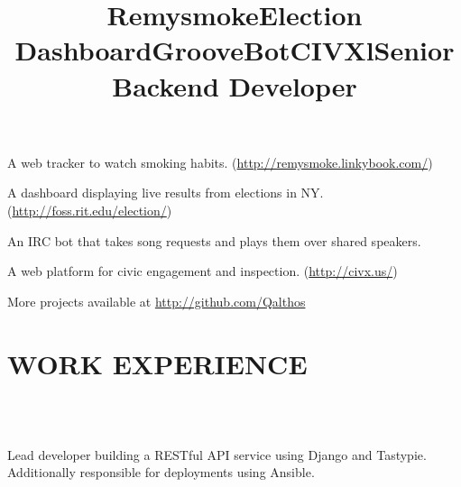 \documentclass[line]{res}
\begin{document}
\begin{resume}
    \title{Remysmoke}
    \begin{position}
        A web tracker to watch smoking habits.
        (\url{http://remysmoke.linkybook.com/})
    \end{position}

    \title{Election Dashboard}
    \begin{position}
        A dashboard displaying live results from elections in NY.
        (\url{http://foss.rit.edu/election/})
    \end{position}

    \title{GrooveBot}
    \begin{position}
        An IRC bot that takes song requests and plays them over shared speakers.
    \end{position}

    \title{CIVX}
    \begin{position}
        A web platform for civic engagement and inspection.
        (\url{http://civx.us/})
    \end{position}

    More projects available at \url{http://github.com/Qalthos}

\section{WORK EXPERIENCE}
    \begin{format}
        \title{l}\\
        \\
        \body
    \end{format}

    \title{Senior Backend Developer}
    \begin{position}
        Lead developer building a RESTful API service using Django and Tastypie.
        Additionally responsible for deployments using Ansible.
    \end{position}


\end{resume}
\end{document}
